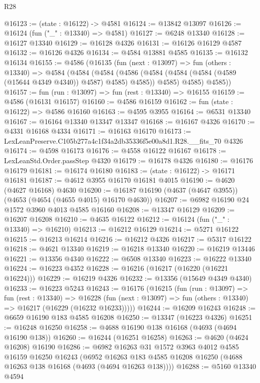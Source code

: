 \begin{lexlean}{R28}
\begin{coremodule}
@16123 := (state : @16122) -> @4581
@16124 := @13842 @13097
@16126 := @16124 (fun ("_" : @13340) => @4581)
@16127 := @6248 @13340
@16128 := @16127 @13340
@16129 := @16128 @4326
@16131 := @16126 @16129 @4587
@16132 := @16126 @4326
@16134 := @4584 @13881 @4585
@16135 := @16132 @16134
@16155 := @4586
    (@16135
      (fun (next : @13097) =>
      fun (others : @13340) =>
      @4584
        (@4584
          (@4584
            (@4586 (@4584 (@4584 (@4584 (@4589 (@15644 @4349 @4340)) @4587) @4585) @4585))
            @4585)
          @4585)
        @4585))
@16157 := fun (run : @13097) => fun (rest : @13340) => @16155
@16159 := @4586 (@16131 @16157)
@16160 := @4586 @16159
@16162 := fun (state : @16122) => @4586 @16160
@16163 := @4595 @3955
@16164 := @6531 @13340
@16167 := @16164 @13340 @13347 @13347
@16168 := @16167 @4326
@16170 := @4331 @16168 @4334
@16171 := @16163 @16170
@16173 := LexLeanPreserve.C105b277a4c1f34a2db35336f5e00a8d1.R28.__fits_70 @4326
@16174 := @4598 @16173
@16176 := @4558 @16122 @16167
@16178 := LexLeanStd.Order.passStep @4320
@16179 := @16178 @4326
@16180 := @16176 @16179
@16181 := @16174 @16180
@16183 := (state : @16122) -> @16171 @16181
@16187 := @4612 @3955 @16170 @16181 @4015
@16190 := @4620 (@4627 @16168) @4630
@16200 := @16187 @16190 (@4637 (@4647 @3955)) (@4653 (@4654 (@4655 @4015) @16170 @4630))
@16207 := @6982 @16190 @24 @1572 @3960 @4013 @4585 @16160
@16208 := @13347 @16129
@16209 := @16207 @16208
@16210 := @4635 @16122
@16212 := @16124 (fun ("_" : @13340) => @16210)
@16213 := @16212 @16129
@16214 := @5271 @16122
@16215 := @16213 @16214
@16216 := @16212 @4326
@16217 := @5317 @16122
@16218 := @4621 @13340
@16219 := @16218 @13340
@16220 := @16219 @13446
@16221 := @13356 @4340
@16222 := @6508 @13340
@16223 := @16222 @13340
@16224 := @16223 @4352
@16228 := @16216 (@16217 (@16220 (@16221 @16224)))
@16229 := @16219 @4326
@16232 := @13356 (@15649 @4349 @4340)
@16233 := @16223 @5243
@16243 := @16176
    (@16215
      (fun (run : @13097) =>
      fun (rest : @13340) =>
      @16228 (fun (next : @13097) => fun (others : @13340) => @16217 (@16229 (@16232 @16233)))))
@16244 := @16209 @16243
@16248 := @6659 @16190 @183 @4585 @16208
@16250 := @13347 (@16223 @4326)
@16251 := @16248 @16250
@16258 := @4688 @16190 @138 @16168 (@4693 (@4694 @16190 @138))
@16260 := @16244 (@16251 @16258)
@16263 := @4620 (@4624 @16208) @16190
@16286 := @6982
    @16263
    @31
    @1572
    @3963
    @4012
    @4585
    @16159
    @16250
    @16243
    (@6952 @16263 @183 @4585 @16208 @16250 (@4688 @16263 @138 @16168 (@4693 (@4694 @16263 @138))))
@16288 := @5160 @13340 @4594

\end{coremodule}
\end{lexlean}
